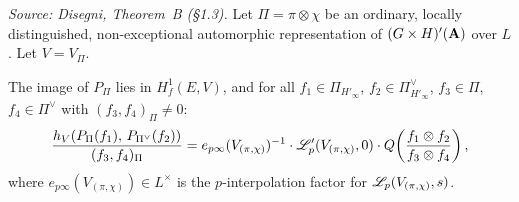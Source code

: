 \begin{theorem}
  \label{thm:TheoremB}
%
%
  \textit{Source: Disegni, Theorem~B (§1.3).}
  Let $\Pi = \pi \otimes \chi$ be an ordinary, locally distinguished,
  non-exceptional automorphic representation of $(G \times H)'(\mathbf{A})$
  over $L$.  Let $V = V_\Pi$.

  The image of $P_\Pi$ lies in $H^1_f(E, V)$, and for all
  $f_1 \in \Pi_{H'_\infty}$, $f_2 \in \Pi^\vee_{H'_\infty}$,
  $f_3 \in \Pi$, $f_4 \in \Pi^\vee$ with $(f_3, f_4)_\Pi \neq 0$:
  \[
    \frac{h_V(P_\Pi(f_1),\, P_{\Pi^\vee}(f_2))}{(f_3, f_4)_\Pi}
    =
    e_{p\infty}(V_{(\pi,\chi)})^{-1}
    \cdot \mathscr{L}_p'(V_{(\pi,\chi)}, 0)
    \cdot Q\!\left(\frac{f_1 \otimes f_2}{f_3 \otimes f_4}\right),
  \]
  where $e_{p\infty}(V_{(\pi,\chi)}) \in L^\times$ is the
  $p$-interpolation factor for $\mathscr{L}_p(V_{(\pi,\chi)},s)$.
\end{theorem}

